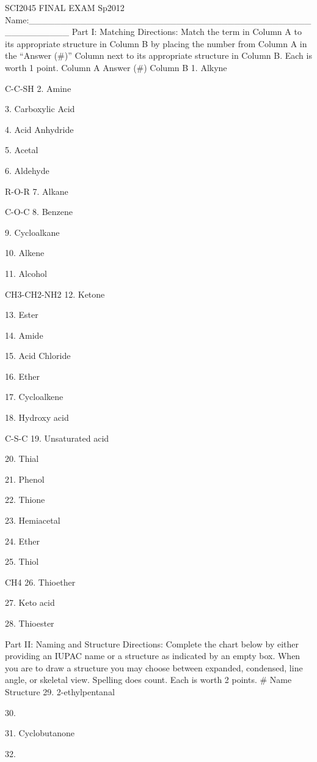 \documentclass[addpoints, 12pt]{exam}
\begin{document}
\begin{questions}

SCI2045					FINAL EXAM						Sp2012
Name:______________________________________________________
Part I:  Matching 
Directions: Match the term in Column A to its appropriate structure in Column B by placing the number from Column A in the “Answer (#)” Column next to its appropriate structure in Column B.  Each is worth 1 point.
Column A
Answer (#)
Column B
1.  Alkyne

C-C-SH 
2.  Amine


3.  Carboxylic Acid


4.  Acid Anhydride


5.  Acetal


6.  Aldehyde

R-O-R
7.  Alkane

C-O-C
8. Benzene


9. Cycloalkane


10. Alkene


11. Alcohol

CH3-CH2-NH2
12. Ketone


13. Ester


14. Amide


15. Acid Chloride


16. Ether


17. Cycloalkene


18. Hydroxy acid

C-S-C 
19. Unsaturated acid


20. Thial


21. Phenol


22. Thione


23. Hemiacetal


24. Ether


25. Thiol

CH4
26. Thioether


27. Keto acid


28. Thioester



Part II: Naming and Structure
Directions: Complete the chart below by either providing an IUPAC name or a structure as indicated by an empty box.  When you are to draw a structure you may choose between expanded, condensed, line angle, or skeletal view.  Spelling does count. Each is worth 2 points.
#
Name
Structure
29.
2-ethylpentanal

30.


31.
Cyclobutanone

32.



\end{questions}
\end{document}
